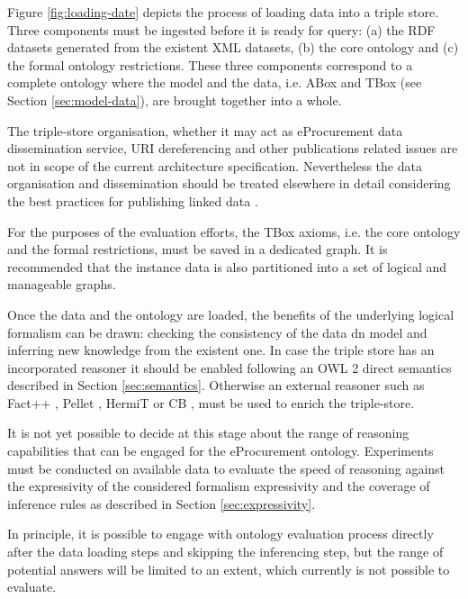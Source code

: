 	Figure \ref{fig:loading-date} depicts the process of loading data into a triple store. Three components must be ingested before it is ready for query: (a) the RDF datasets generated from the existent XML datasets, (b) the core ontology and (c) the formal ontology restrictions. These three components correspond to a complete ontology where the model and the data, i.e. ABox and TBox (see Section \ref{sec:model-data}), are brought together into a whole.
	
	The triple-store organisation, whether it may act as eProcurement data dissemination service, URI dereferencing and other publications related issues are not in scope of the current architecture specification. Nevertheless the data organisation and dissemination should be treated elsewhere in detail considering the best practices for publishing linked data \cite{bizer2009emerging}.
	
	For the purposes of the evaluation efforts, the TBox axioms, i.e. the core ontology and the formal restrictions, must be saved in a dedicated graph.  It is recommended that the instance data is also partitioned into a set of logical and manageable graphs.  

	Once the data and the ontology are loaded, the benefits of the underlying logical formalism can be drawn: checking the consistency of the data dn model and inferring new knowledge from the existent one. In case the triple store has an incorporated reasoner it should be enabled following an OWL 2 direct semantics described in Section \ref{sec:semantics}. Otherwise an external reasoner such as Fact++ \cite{tsarkov2006fact++}, Pellet \cite{sirin2007pellet}, HermiT \cite{shearer2008hermit} or CB \cite{kazakov2009consequence}, must be used to enrich the triple-store. 
	
	It is not yet possible to decide at this stage about the range of reasoning capabilities that can be engaged for the eProcurement ontology. Experiments must be conducted on available data to evaluate the speed of reasoning against the expressivity of the considered formalism expressivity and the coverage of inference rules as described in Section \ref{sec:expressivity}.
	
	In principle, it is possible to engage with ontology evaluation process directly after the data loading steps and skipping the inferencing step, but the range of potential answers will be limited to an extent, which currently is not possible to evaluate.
		
